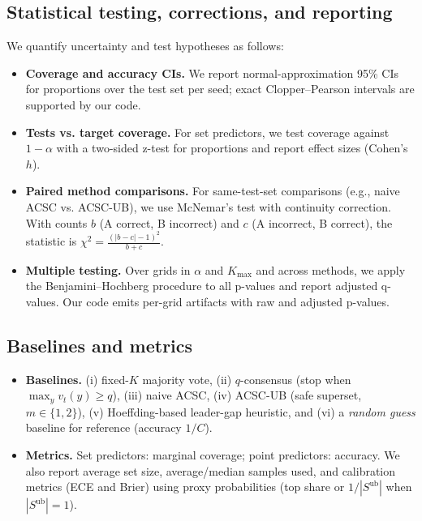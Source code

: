 \documentclass[11pt]{article}
\begin{document}
\subsection{Statistical testing, corrections, and reporting}
\label{sec:stats}
We quantify uncertainty and test hypotheses as follows:
\begin{itemize}
\item \textbf{Coverage and accuracy CIs.} We report normal-approximation 95\% CIs for proportions over the test set per seed; exact Clopper--Pearson intervals \cite{clopper1934use} are supported by our code.
\item \textbf{Tests vs. target coverage.} For set predictors, we test coverage against $1-\alpha$ with a two-sided z-test for proportions and report effect sizes (Cohen’s $h$).
\item \textbf{Paired method comparisons.} For same-test-set comparisons (e.g., naive ACSC vs. ACSC-UB), we use McNemar’s test with continuity correction. With counts $b$ (A correct, B incorrect) and $c$ (A incorrect, B correct), the statistic is $\chi^2 = \frac{(|b-c|-1)^2}{b+c}$.
\item \textbf{Multiple testing.} Over grids in $\alpha$ and $K_{\max}$ and across methods, we apply the Benjamini--Hochberg procedure \cite{benjamini1995controlling} to all p-values and report adjusted q-values. Our code emits per-grid artifacts with raw and adjusted p-values.
\end{itemize}

\subsection{Baselines and metrics}
\begin{itemize}
\item \textbf{Baselines.} (i) fixed-$K$ majority vote, (ii) $q$-consensus (stop when $\max_y v_t(y)\ge q$), (iii) naive ACSC, (iv) ACSC-UB (safe superset, $m\in\{1,2\}$), (v) Hoeffding-based leader-gap heuristic, and (vi) a \emph{random guess} baseline for reference (accuracy $1/C$).
\item \textbf{Metrics.} Set predictors: marginal coverage; point predictors: accuracy. We also report average set size, average/median samples used, and calibration metrics (ECE and Brier) using proxy probabilities (top share or $1/|S^{\text{ub}}|$ when $|S^{\text{ub}}|=1$).
\end{itemize}
\end{document}
